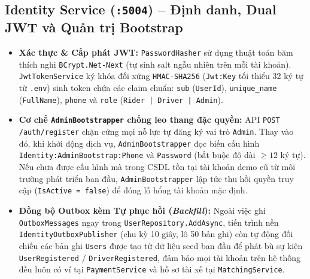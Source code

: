 \documentclass[12pt,a4paper]{article}
\begin{document}
\subsection{Identity Service (\texttt{:5004}) -- Định danh, Dual JWT và Quản trị Bootstrap}
\begin{itemize}[nosep]
    \item \textbf{Xác thực \& Cấp phát JWT:} \texttt{PasswordHasher} sử dụng thuật toán băm thích nghi \texttt{BCrypt.Net-Next} (tự sinh salt ngẫu nhiên trên mỗi tài khoản). \texttt{JwtTokenService} ký khóa đối xứng \texttt{HMAC-SHA256} (\texttt{Jwt:Key} tối thiểu 32 ký tự từ \texttt{.env}) sinh token chứa các claim chuẩn: \texttt{sub} (\texttt{UserId}), \texttt{unique\_name} (\texttt{FullName}), \texttt{phone} và \texttt{role} (\texttt{Rider | Driver | Admin}).
    \item \textbf{Cơ chế \texttt{AdminBootstrapper} chống leo thang đặc quyền:} API \texttt{POST /auth/register} chặn cứng mọi nỗ lực tự đăng ký vai trò \texttt{Admin}. Thay vào đó, khi khởi động dịch vụ, \texttt{AdminBootstrapper} đọc biến cấu hình \texttt{Identity:AdminBootstrap:Phone} và \texttt{Password} (bắt buộc độ dài $\ge 12$ ký tự). Nếu chưa được cấu hình mà trong CSDL tồn tại tài khoản demo cũ từ môi trường phát triển ban đầu, \texttt{AdminBootstrapper} lập tức thu hồi quyền truy cập (\texttt{IsActive = false}) để đóng lỗ hổng tài khoản mặc định.
    \item \textbf{Đồng bộ Outbox kèm Tự phục hồi (\textit{Backfill}):} Ngoài việc ghi \texttt{OutboxMessages} ngay trong \texttt{UserRepository.AddAsync}, tiến trình nền \texttt{IdentityOutboxPublisher} (chu kỳ 10 giây, lô 50 bản ghi) còn tự động đối chiếu các bản ghi \texttt{Users} được tạo từ dữ liệu seed ban đầu để phát bù sự kiện \texttt{UserRegistered} / \texttt{DriverRegistered}, đảm bảo mọi tài khoản trên hệ thống đều luôn có ví tại \texttt{PaymentService} và hồ sơ tài xế tại \texttt{MatchingService}.
\end{itemize}
\end{document}
